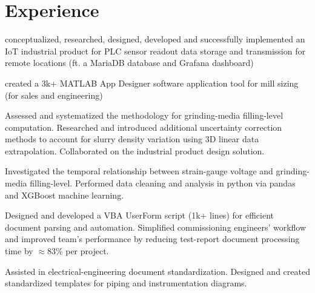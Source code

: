 \documentclass[]{plushcv}
\begin{document}

\vspace*{1cm}
\begin{minipage}[t]{0.70\textwidth} 

\section{Experience}
	\vspace{\topsep} %
	\begin{tightemize}
		\item conceptualized, researched, designed, developed and successfully implemented an IoT industrial product for PLC sensor readout data storage and transmission for remote locations (ft. a MariaDB database and Grafana dashboard)
		\item created a 3k+ MATLAB App Designer software application tool for mill sizing (for sales and engineering)
		\item Assessed and systematized the methodology for grinding-media filling-level computation. Researched and introduced additional uncertainty correction methods to account for slurry density variation using 3D linear data extrapolation. Collaborated on the industrial product design solution.
	\end{tightemize}
	\subskip
	
	\begin{tightemize}
		\item Investigated the temporal relationship between strain-gauge voltage and grinding-media filling-level. Performed data cleaning and analysis in python via pandas and XGBoost machine learning.
		\item Designed and developed a VBA UserForm script (1k+ lines) for efficient document parsing and automation. Simplified commissioning engineers' workflow and improved team's performance by reducing test-report document processing time by $\approx$83\% per project. 
		\item Assisted in electrical-engineering document standardization. Designed and created standardized templates for piping and instrumentation diagrams.
	\end{tightemize}




\end{minipage}
\end{document}
